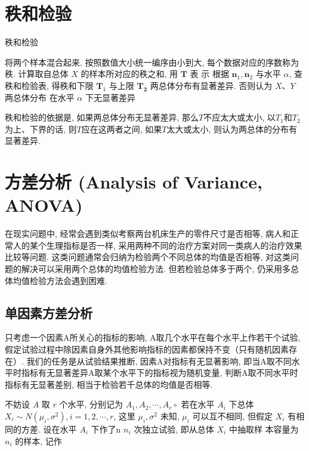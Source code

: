 \section{秩和检验}

\begin{algorithm}\caption{秩和检验}
将两个样本混合起来, 按照数值大小统一编序由小到大, 每个数据对应的序数称为秩. \;
计算取自总体 \( X \) 的样本所对应的秩之和, 用 \( \boldsymbol{T} \) 表 示\;
根据 \( \boldsymbol{n}_{1}, \boldsymbol{n}_{2} \) 与水平 \( \alpha \), 查秩和检验表, 得秩和下限 \( \boldsymbol{T}_{1} \) 与上限 \( \boldsymbol{T}_{\mathbf{2}} \) \;
两总体分布有显著差异. 否则认为 \( X 、 Y \) 两总体分布
在水平 \( \alpha \) 下无显著差异\;
\end{algorithm}

秩和检验的依据是, 如果两总体分布无显著差异, 那么$T$不应太大或太小, 以$T_1$和$T_2$为上、下界的话, 则$T$应在这两者之间, 如果$T$太大或太小, 则认为两总体的分布有显著差异. 

\section{方差分析 (Analysis of Variance, ANOVA)}

在现实问题中, 经常会遇到类似考察两台机床生产的零件尺寸是否相等, 病人和正常人的某个生理指标是否一样, 采用两种不同的治疗方案对同一类病人的治疗效果比较等问题. 这类问题通常会归纳为检验两个不同总体的均值是否相等, 对这类问题的解决可以采用两个总体的均值检验方法. 但若检验总体多于两个, 仍采用多总体均值检验方法会遇到困难. 

\subsection{单因素方差分析}

只考虑一个因素A所关心的指标的影响, A取几个水平在每个水平上作若干个试验, 假定试验过程中除因素自身外其他影响指标的因素都保持不变（只有随机因素存在）. 我们的任务是从试验结果推断, 因素A对指标有无显著影响, 即当A取不同水平时指标有无显著差异A取某个水平下的指标视为随机变量, 判断A取不同水平时指标有无显著差别, 相当于检验若千总体的均值是否相等. 

不妨设 $A$ 取 $r$ 个水平, 分别记为 $A_{1}, A_{2}, \cdots, A_{r} \circ$ 若在水平 $A_{i}$ 下总体 $X_{i} \sim N\left(\mu_{i}, \sigma^{2}\right), i=1,2, \cdots, r$, 这里 $\mu_{i}, \sigma^{2}$ 未知, $\mu_{i}$ 可以互不相同, 但假定 $X_{i}$ 有相同的方差.  设在水平 $A_{i}$ 下作了n $n_{i}$ 次独立试验, 即从总体 $X_{i}$ 中抽取样 本容量为 $n_{i}$ 的样本, 记作

